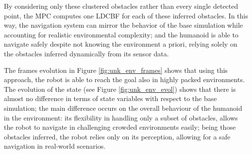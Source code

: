By considering only these clustered obstacles rather than every single detected point, the MPC
computes one LDCBF for each of these inferred obstacles. In this way, the navigation system can mirror
the behavior of the base simulation while accounting for realistic environmental complexity; and the humanoid is
able to navigate safely despite not knowing the environment a priori, relying solely on the obstacles inferred dynamically from its sensor data.

The frames evolution in Figure \ref{fig:unk_env_frames} shows that using this approach, the robot is able to reach
the goal also in highly packed environments. The evolution of the state (see
Figure \ref{fig:unk_env_evol}) shows that there is almost no difference
in terms of state variables with respect to the base simulation;  the main difference occurs on the overall behaviour
of the humanoid in the environment: its flexibility in handling only a subset of obstacles, allows the robot to
navigate in challenging crowded environments easily;  being those obstacles inferred, the robot relies only on its
perception, allowing for a safe navigation in real-world scenarios.





